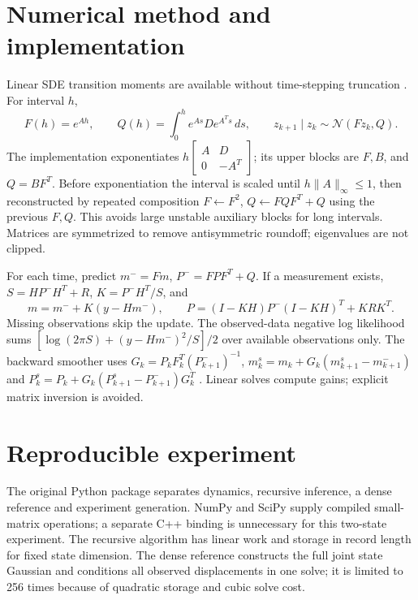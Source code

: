 \documentclass[10pt,a4paper]{article}
\begin{document}
\section{Numerical method and implementation}
Linear SDE transition moments are available without time-stepping truncation
\cite{sde}. For interval $h$,
\begin{equation}
 F(h)=e^{Ah},\qquad Q(h)=\int_0^h e^{As}D e^{A^Ts}\,ds,\qquad
 z_{k+1}\mid z_k\sim\mathcal N(Fz_k,Q).
 \label{eq:transition}
\end{equation}
The implementation exponentiates $h[\begin{smallmatrix}A&D\\0&-A^T\end{smallmatrix}]$;
its upper blocks are $F,B$, and $Q=BF^T$. Before exponentiation the interval is
scaled until $h\|A\|_\infty\leq1$, then reconstructed by repeated composition
$F\leftarrow F^2$, $Q\leftarrow FQF^T+Q$ using the previous $F,Q$.
This avoids large unstable auxiliary blocks for long intervals. Matrices are
symmetrized to remove antisymmetric roundoff; eigenvalues are not clipped.

For each time, predict $m^-=Fm$, $P^-=FPF^T+Q$. If a measurement exists,
$S=HP^-H^T+R$, $K=P^-H^T/S$, and
\begin{equation}
 m=m^-+K(y-Hm^-),\qquad
 P=(I-KH)P^-(I-KH)^T+KRK^T.
\end{equation}
Missing observations skip the update. The observed-data negative log likelihood
sums $[\log(2\pi S)+(y-Hm^-)^2/S]/2$ over available observations only.
The backward smoother uses $G_k=P_kF_k^T(P^-_{k+1})^{-1}$,
$m_k^s=m_k+G_k(m_{k+1}^s-m^-_{k+1})$ and
$P_k^s=P_k+G_k(P_{k+1}^s-P^-_{k+1})G_k^T$ \cite{bfs}.
Linear solves compute gains; explicit matrix inversion is avoided.

\clearpage
\section{Reproducible experiment}
The original Python package separates dynamics, recursive inference, a dense
reference and experiment generation. NumPy and SciPy supply compiled small-matrix
operations; a separate C++ binding is unnecessary for this two-state experiment.
The recursive algorithm has linear work and storage in record length for fixed
state dimension. The dense reference constructs the full joint state Gaussian
and conditions all observed displacements in one solve; it is limited to 256
times because of quadratic storage and cubic solve cost.
\end{document}
